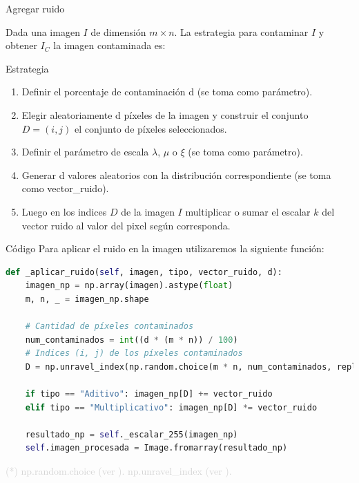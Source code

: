 \documentclass{beamer}
\begin{document}
\begin{frame}[fragile]{Agregar ruido}
	\justifying
	
	Dada una imagen $I$ de dimensión $m \times n$. La estrategia para contaminar $I$ y obtener $I_C$ la imagen contaminada es:
	
	\begin{block}{Estrategia}
		\begin{enumerate}
			\item Definir el porcentaje de contaminación d (se toma como parámetro).
			\item Elegir aleatoriamente d píxeles de la imagen y construir el conjunto $D = (i,j)$ el conjunto de píxeles seleccionados.
			\item Definir el parámetro de escala $\lambda$, $\mu$ o $\xi$ (se toma como parámetro).
			\item Generar d valores aleatorios con la distribución correspondiente (se toma como vector\_ruido).
			\item Luego en los indices $D$ de la imagen $I$ multiplicar o sumar el escalar  $k$ del vector ruido al valor del pixel según corresponda.
		\end{enumerate}
	\end{block}
\end{frame}


\begin{frame}[fragile]{Código}
	\justifying
	Para aplicar el ruido en la imagen utilizaremos la siguiente función:
	
	\begin{lstlisting}[language=Python]
def _aplicar_ruido(self, imagen, tipo, vector_ruido, d):
	imagen_np = np.array(imagen).astype(float)
	m, n, _ = imagen_np.shape
	
	# Cantidad de píxeles contaminados
	num_contaminados = int((d * (m * n)) / 100)
	# Indices (i, j) de los píxeles contaminados
	D = np.unravel_index(np.random.choice(m * n, num_contaminados, replace=False),(m, n))
	
	if tipo == "Aditivo": imagen_np[D] += vector_ruido
	elif tipo == "Multiplicativo": imagen_np[D] *= vector_ruido
	
	resultado_np = self._escalar_255(imagen_np)
	self.imagen_procesada = Image.fromarray(resultado_np)
	\end{lstlisting}
	
	\vfill
	\footnotesize \textcolor{lightgray}{(*) np.random.choice (ver \cite{numpy.random.choice}). np.unravel\_index (ver \cite{numpy.unravel_index}).}
\end{frame}
\end{document}
